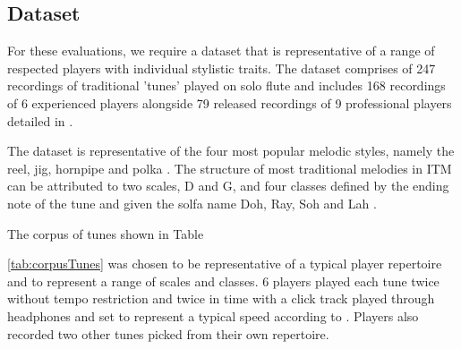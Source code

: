 \documentclass{article}
\begin{document}
{{\subsection{Dataset}\label{sec:dataset}
For these evaluations, we require a dataset that is representative of a range of respected players with individual stylistic traits. The dataset comprises of 247 recordings of traditional 'tunes' played on solo flute and includes 168 recordings of 6 experienced players alongside 79 released recordings of 9 professional players detailed in \cite{ali-maclachlan_islah_note_2016}. 

The dataset is representative of the four most popular melodic styles, namely the reel, jig, hornpipe and polka \cite{hast_music_2004}. The structure of most traditional melodies in ITM can be attributed to two scales, D and G, and four classes defined by the ending note of the tune and given the solfa name Doh, Ray, Soh and Lah \cite{breathnach_folk_1996, o_canainn_traditional_1978}. 

The corpus of tunes shown in Table {\ref{tab:corpusTunes} was chosen to be representative of a typical player repertoire and to represent a range of scales and classes. 6 players played each tune twice without tempo restriction and twice in time with a click track played through headphones and set to represent a typical speed according to \cite{breathnach_ceol_1963}. Players also recorded two other tunes picked from their own repertoire.

\begin{table}[]
\centering


\end{table}}}}
\end{document}
